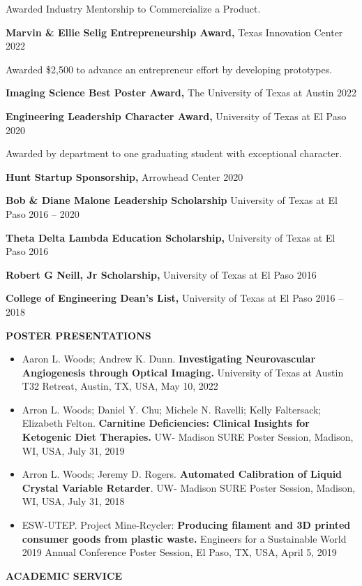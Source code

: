 \documentclass[11pt]{article}
\newcommand{\sectionheading}[1]{%
  \vspace{1.6ex}%
  {\large\bfseries\MakeUppercase{#1}}\par\vspace{0.6ex}%
}
\begin{document}
Awarded Industry Mentorship to Commercialize a Product.

\textbf{Marvin \& Ellie Selig Entrepreneurship Award,} Texas Innovation Center 2022

Awarded \$2,500 to advance an entrepreneur effort by developing prototypes.

\textbf{Imaging Science Best Poster Award,} The University of Texas at Austin 2022

\textbf{Engineering Leadership Character Award,} University of Texas at El Paso 2020

Awarded by department to one graduating student with exceptional character.

\textbf{Hunt Startup Sponsorship,} Arrowhead Center 2020

\textbf{Bob \& Diane Malone Leadership Scholarship} University of Texas at El Paso 2016 -- 2020

\textbf{Theta Delta Lambda Education Scholarship,} University of Texas at El Paso 2016

\textbf{Robert G Neill, Jr Scholarship,} University of Texas at El Paso 2016

\textbf{College of Engineering Dean's List,} University of Texas at El Paso 2016 -- 2018

\sectionheading{POSTER PRESENTATIONS}

\begin{itemize}
\item
  Aaron L. Woods; Andrew K. Dunn. \textbf{Investigating Neurovascular Angiogenesis through Optical Imaging.} University of Texas at Austin T32 Retreat, Austin, TX, USA, May 10, 2022
\item
  Arron L. Woods; Daniel Y. Chu; Michele N. Ravelli; Kelly Faltersack; Elizabeth Felton. \textbf{Carnitine Deficiencies: Clinical Insights for Ketogenic Diet Therapies.} UW- Madison SURE Poster Session, Madison, WI, USA, July 31, 2019
\item
  Arron L. Woods; Jeremy D. Rogers. \textbf{Automated Calibration of Liquid Crystal Variable Retarder}. UW- Madison SURE Poster Session, Madison, WI, USA, July 31, 2018
\item
  ESW-UTEP. Project Mine-Rcycler: \textbf{Producing filament and 3D printed consumer goods from plastic waste.} Engineers for a Sustainable World 2019 Annual Conference Poster Session, El Paso, TX, USA, April 5, 2019
\end{itemize}

\sectionheading{ACADEMIC SERVICE}
\end{document}
